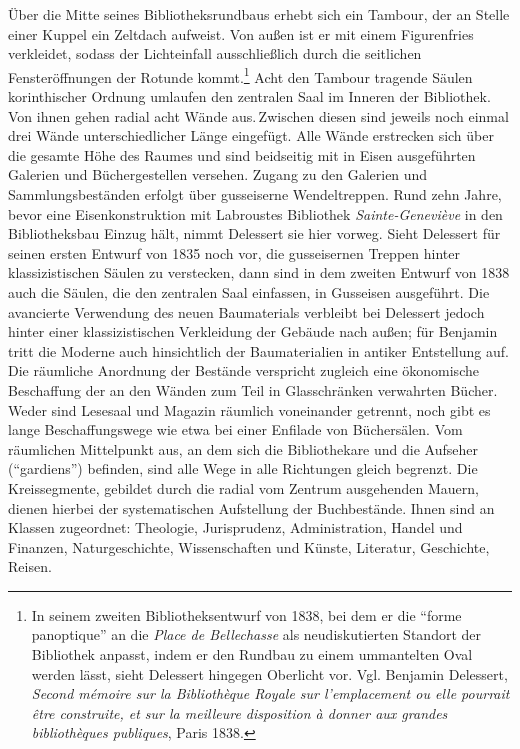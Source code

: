 Über die Mitte seines Bibliotheksrundbaus erhebt sich ein Tambour, der
an Stelle einer Kuppel ein Zeltdach aufweist. Von außen ist er mit einem
Figurenfries verkleidet, sodass der Lichteinfall ausschließlich durch
die seitlichen Fensteröffnungen der Rotunde kommt.\footnote{In seinem
  zweiten Bibliotheksentwurf von 1838, bei dem er die \enquote{forme
  panoptique} an die \emph{Place de Bellechasse} als neudiskutierten
  Standort der Bibliothek anpasst, indem er den Rundbau zu einem
  ummantelten Oval werden lässt, sieht Delessert hingegen Oberlicht vor.
  Vgl. Benjamin Delessert, \emph{Second mémoire sur la Bibliothèque
  Royale sur l'emplacement ou elle pourrait être construite, et sur la
  meilleure disposition à donner aux grandes bibliothèques publiques},
  Paris 1838.} Acht den Tambour tragende Säulen korinthischer Ordnung
umlaufen den zentralen Saal im Inneren der Bibliothek. Von ihnen gehen
radial acht Wände aus.\,Zwischen diesen sind jeweils noch einmal drei
Wände unterschiedlicher Länge eingefügt. Alle Wände erstrecken sich über
die gesamte Höhe des Raumes und sind beidseitig mit in Eisen
ausgeführten Galerien und Büchergestellen versehen. Zugang zu den
Galerien und Sammlungsbeständen erfolgt über gusseiserne Wendeltreppen.
Rund zehn Jahre, bevor eine Eisenkonstruktion mit Labroustes Bibliothek
\emph{Sainte-Geneviève} in den Bibliotheksbau Einzug hält, nimmt
Delessert sie hier vorweg. Sieht Delessert für seinen ersten Entwurf von
1835 noch vor, die gusseisernen Treppen hinter klassizistischen Säulen
zu verstecken, dann sind in dem zweiten Entwurf von 1838 auch die
Säulen, die den zentralen Saal einfassen, in Gusseisen ausgeführt. Die
avancierte Verwendung des neuen Baumaterials verbleibt bei Delessert
jedoch hinter einer klassizistischen Verkleidung der Gebäude nach außen;
für Benjamin tritt die Moderne auch hinsichtlich der Baumaterialien in
antiker Entstellung auf. Die räumliche Anordnung der Bestände verspricht
zugleich eine ökonomische Beschaffung der an den Wänden zum Teil in
Glasschränken verwahrten Bücher. Weder sind Lesesaal und Magazin
räumlich voneinander getrennt, noch gibt es lange Beschaffungswege wie
etwa bei einer Enfilade von Büchersälen. Vom räumlichen Mittelpunkt aus,
an dem sich die Bibliothekare und die Aufseher (\enquote{gardiens})
befinden, sind alle Wege in alle Richtungen gleich begrenzt. Die
Kreissegmente, gebildet durch die radial vom Zentrum ausgehenden Mauern,
dienen hierbei der systematischen Aufstellung der Buchbestände. Ihnen
sind an Klassen zugeordnet: Theologie, Jurisprudenz, Administration,
Handel und Finanzen, Naturgeschichte, Wissenschaften und Künste,
Literatur, Geschichte, Reisen.

